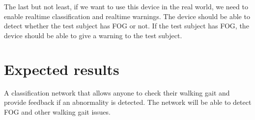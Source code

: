 \documentclass[10pt,twocolumn,letterpaper]{article}
\begin{document}
    The last but not least, if we want to use this device in the real world, we need to enable realtime classification and realtime warnings. The device should be able to detect whether the test subject has FOG or not. If the test subject has FOG, the device should be able to give a warning to the test subject.


\section{Expected results}
\label{sec:results}

A classification network that allows anyone to check their walking gait and provide feedback if an abnormality is detected. The network will be able to detect FOG and other walking gait issues.

{\small


}
\end{document}
